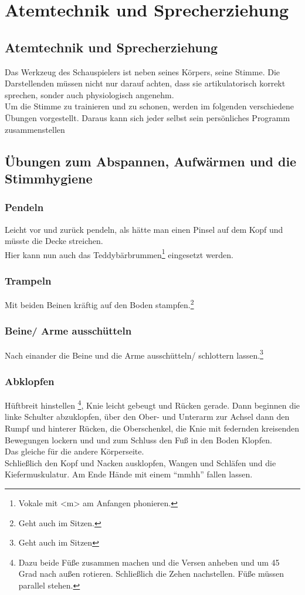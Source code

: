 \documentclass[ngerman, a4paper, twoside]{scrbook}%
\begin{document}
	\setcounter{chapter}{0}
	\setcounter{section}{0}
	\part{Atemtechnik und Sprecherziehung}
	\chapter{Atemtechnik und Sprecherziehung}
	Das Werkzeug des Schauspielers ist neben seines Körpers, seine Stimme. Die Darstellenden müssen nicht nur darauf achten, dass sie artikulatorisch korrekt sprechen, sonder auch physiologisch angenehm.\\
	Um die Stimme zu trainieren und zu schonen, werden im folgenden verschiedene Übungen vorgestellt. Daraus kann sich jeder selbst sein persönliches Programm zusammenstellen


	\chapter{Übungen zum Abspannen, Aufwärmen und die Stimmhygiene}


	\section{Pendeln}
	Leicht vor und zurück pendeln, als hätte man einen Pinsel auf dem Kopf und müsste die Decke streichen.\\
	Hier kann nun auch das Teddybärbrummen\footnote{Vokale mit <m> am Anfangen phonieren.} eingesetzt werden.

	\section{Trampeln}
	Mit beiden Beinen kräftig auf den Boden stampfen.\footnote{Geht auch im Sitzen.}

	\section{Beine/ Arme ausschütteln}
	Nach einander die Beine und die Arme ausschütteln/ schlottern lassen.\footnote{Geht auch im Sitzen}

	\section{Abklopfen}
	Hüftbreit hinstellen \footnote{Dazu beide Füße zusammen machen und die Versen anheben und um 45 Grad nach außen rotieren. Schließlich die Zehen nachstellen. Füße müssen parallel stehen.}, Knie leicht gebeugt und Rücken gerade. Dann beginnen die linke Schulter abzuklopfen, über den Ober- und Unterarm zur Achsel dann den Rumpf und hinterer Rücken, die Oberschenkel, die Knie mit federnden kreisenden Bewegungen lockern und und zum Schluss den Fuß in den Boden Klopfen.\\
	Das gleiche für die andere Körperseite.\\
	Schließlich den Kopf und Nacken ausklopfen, Wangen und Schläfen und die Kiefermuskulatur.
	Am Ende Hände mit einem "`mmhh"' fallen lassen.
\end{document}
